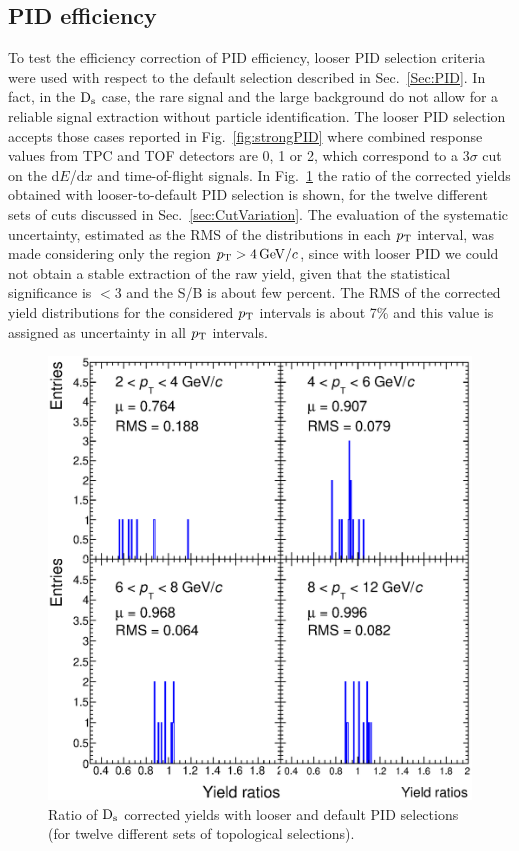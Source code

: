 \subsection{PID efficiency}
\label{sec:PIDsystPP}
To test the efficiency correction of PID efficiency, looser PID selection criteria were
used with respect to the default selection described in Sec.~\ref{Sec:PID}. 
In fact, in the ${\rm D_s}$ case, the rare signal and the large background 
do not allow for a reliable signal extraction without 
particle identification. The looser PID selection accepts those cases 
reported in Fig.~\ref{fig:strongPID} where combined response values from TPC and TOF 
detectors are 0, 1 or 2, which correspond to a 3$\sigma$ cut on the d$E$/d$x$ and
time-of-flight signals.
In Fig.~\ref{fig:rmsPID} the ratio
of the corrected yields obtained with looser-to-default PID selection is shown, 
for the twelve different sets of cuts discussed in Sec.~\ref{sec:CutVariation}.
The evaluation of the systematic uncertainty, estimated as the RMS of the distributions in each $p_{\rm T}$ 
interval, was made considering only the region $p_{\rm T} > 4 \, \mathrm{GeV}/c$, since 
with looser PID we could not obtain a stable extraction of the raw yield, given 
that the statistical significance is $<3$ and the S/B is about few percent.
The RMS of the corrected yield distributions for the considered
$p_{\rm T}$ intervals is about 7\% and this value is assigned as uncertainty in all $p_{\rm T}$ intervals.

\begin{figure}[!htb]
\begin{center}
 \includegraphics[width=.7\textwidth]{FigCap4/PIDrms4x4}
\caption{Ratio of ${\rm D_s}$ corrected yields with looser and default PID selections (for twelve different sets of
topological selections).}
\label{fig:rmsPID}
\end{center}
\end{figure}

